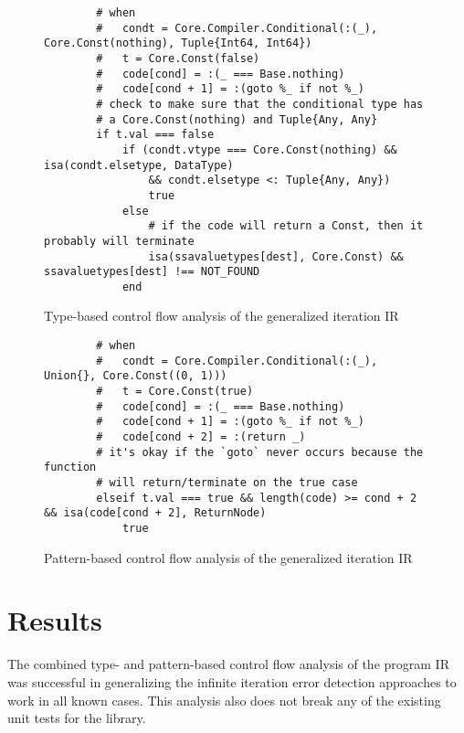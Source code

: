 \documentclass[manuscript, nonacm]{acmart}
\begin{document}
\begin{figure}
    \begin{verbatim}
        # when
        #   condt = Core.Compiler.Conditional(:(_), Core.Const(nothing), Tuple{Int64, Int64})
        #   t = Core.Const(false)
        #   code[cond] = :(_ === Base.nothing)
        #   code[cond + 1] = :(goto %_ if not %_)
        # check to make sure that the conditional type has
        # a Core.Const(nothing) and Tuple{Any, Any}
        if t.val === false
            if (condt.vtype === Core.Const(nothing) && isa(condt.elsetype, DataType)
                && condt.elsetype <: Tuple{Any, Any})
                true
            else
                # if the code will return a Const, then it probably will terminate
                isa(ssavaluetypes[dest], Core.Const) && ssavaluetypes[dest] !== NOT_FOUND
            end
    \end{verbatim}
    \caption{Type-based control flow analysis of the generalized iteration IR}
    \label{fig:type-cfa-ir}
\end{figure}

\begin{figure}
    \begin{verbatim}
        # when
        #   condt = Core.Compiler.Conditional(:(_), Union{}, Core.Const((0, 1)))
        #   t = Core.Const(true)
        #   code[cond] = :(_ === Base.nothing)
        #   code[cond + 1] = :(goto %_ if not %_)
        #   code[cond + 2] = :(return _)
        # it's okay if the `goto` never occurs because the function
        # will return/terminate on the true case
        elseif t.val === true && length(code) >= cond + 2 && isa(code[cond + 2], ReturnNode)
            true
    \end{verbatim}
    \caption{Pattern-based control flow analysis of the generalized iteration IR}
    \label{fig:pattern-cfa-ir}
\end{figure}

\section{Results}
The combined type- and pattern-based control flow analysis of the program IR was successful in generalizing the infinite iteration error detection approaches to work in all known cases. This analysis also does not break any of the existing unit tests for the library.


\end{document}
